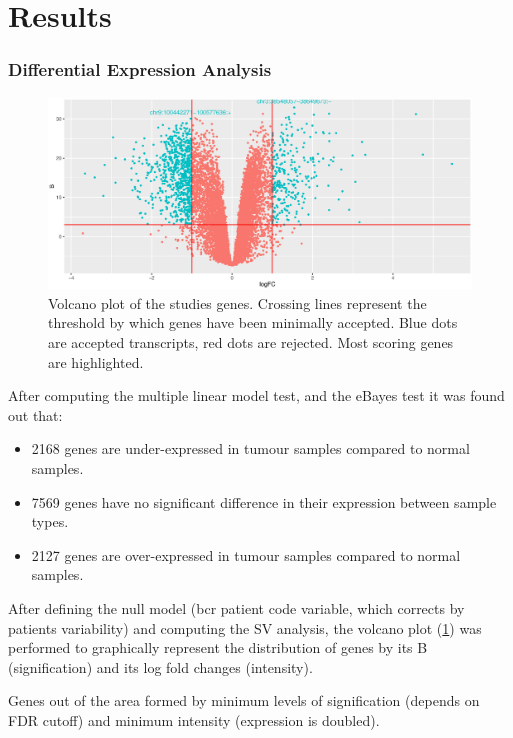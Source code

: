 \documentclass[9pt,twocolumn,twoside]{gsajnl}
\begin{document}
\section*{Results}
\subsubsection*{Differential Expression Analysis}

\begin{figure}[!h]
\centering
\includegraphics[width=\linewidth]{Volcano.eps}
\caption{Volcano plot of the studies genes. Crossing lines represent the threshold by which genes have been minimally accepted. Blue dots are accepted transcripts, red dots are rejected. Most scoring genes are highlighted.}
\label{fig:volcano}
\end{figure}

After computing the multiple linear model test, and the eBayes test \cite{limma} 	it was found out that:

\begin{itemize}
\item 2168 genes are under-expressed in tumour samples compared to normal samples.
\item 7569 genes have no significant difference in their expression between sample types.
\item 2127 genes are over-expressed in tumour samples compared to normal samples.
\end{itemize}

After defining the null model (bcr patient code variable, which corrects by patients variability) and computing the SV analysis, the volcano plot (\ref{fig:volcano}) was performed to graphically represent the distribution of genes by its B (signification) and its log fold changes (intensity).

Genes out of the area formed by minimum levels of signification (depends on FDR cutoff) and minimum intensity (expression is doubled).
\end{document}
